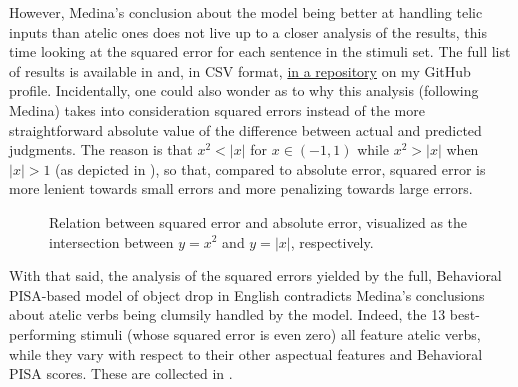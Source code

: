 However, Medina's conclusion about the model being better at handling telic inputs than atelic ones does not live up to a closer analysis of the results, this time looking at the squared error for each sentence in the stimuli set. The full list of results is available in  and, in CSV format, \href{https://github.com/giuliacappelli/dissertationData}{in a repository} on my GitHub profile. Incidentally, one could also wonder as to why this analysis (following Medina) takes into consideration squared errors instead of the more straightforward absolute value of the difference between actual and predicted judgments. The reason is that $x^2 < |x|$ for $x \in (-1,1)$ while $x^2 > |x|$ when $|x| > 1$ (as depicted in ), so that, compared to absolute error, squared error is more lenient towards small errors and more penalizing towards large errors.

\begin{figure}[htb]
\caption{Relation between squared error and absolute error, visualized as the intersection between $y = x^2$ and $y = |x|$, respectively.}
\end{figure}

With that said, the analysis of the squared errors yielded by the full, Behavioral PISA-based model of object drop in English contradicts Medina's conclusions about atelic verbs being clumsily handled by the model. Indeed, the 13 best-performing stimuli (whose squared error is even zero) all feature atelic verbs, while they vary with respect to their other aspectual features and Behavioral PISA scores. These are collected in .

